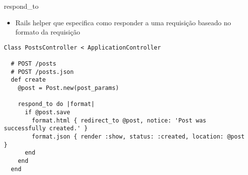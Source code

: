 \begin{frame}{respond\_to}
	\begin{itemize}
		\item Rails \alert{helper} que \alert{especifica como responder a uma requisição} baseado no 
			formato da requisição
	\end{itemize}	
	\begin{lstlisting}[style=RubyInputStyle, caption=controllers/posts\_controller.rb]
Class PostsController < ApplicationController

  # POST /posts
  # POST /posts.json
  def create
    @post = Post.new(post_params)

    respond_to do |format|
      if @post.save
        format.html { redirect_to @post, notice: 'Post was successfully created.' }
        format.json { render :show, status: :created, location: @post }
      end
    end
  end
	\end{lstlisting}	
\end{frame}